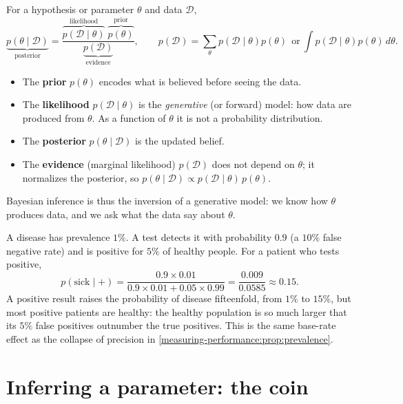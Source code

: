 \begin{notechapter}
For a hypothesis or parameter $\theta$ and data $\mathcal D$,
\[
  \underbrace{p(\theta\mid\mathcal D)}_{\text{posterior}}
  = \frac{\overbrace{p(\mathcal D\mid\theta)}^{\text{likelihood}}\;\overbrace{p(\theta)}^{\text{prior}}}{\underbrace{p(\mathcal D)}_{\text{evidence}}},
  \qquad
  p(\mathcal D) = \sum_\theta p(\mathcal D\mid\theta)p(\theta)\ \ \text{or}\ \int p(\mathcal D\mid\theta)p(\theta)\,d\theta .
\]
\begin{itemize}
  \item The \textbf{prior} $p(\theta)$ encodes what is believed before seeing the
        data.
  \item The \textbf{likelihood} $p(\mathcal D\mid\theta)$ is the \emph{generative}
        (or forward) model: how data are produced from $\theta$. As a function of
        $\theta$ it is not a probability distribution.
  \item The \textbf{posterior} $p(\theta\mid\mathcal D)$ is the updated belief.
  \item The \textbf{evidence} (marginal likelihood) $p(\mathcal D)$ does not depend
        on $\theta$; it normalizes the posterior, so
        $p(\theta\mid\mathcal D)\propto p(\mathcal D\mid\theta)\,p(\theta)$.
\end{itemize}
Bayesian inference is thus the inversion of a generative model: we know how
$\theta$ produces data, and we ask what the data say about $\theta$.

\begin{example}\label{bayesian-reasoning:ex:medical}
A disease has prevalence $1\%$. A test detects it with probability $0.9$ (a
$10\%$ false negative rate) and is positive for $5\%$ of healthy people. For a
patient who tests positive,
\[
  p(\text{sick}\mid+) = \frac{0.9\times0.01}{0.9\times0.01 + 0.05\times0.99}
  = \frac{0.009}{0.0585}\approx0.15 .
\]
A positive result raises the probability of disease fifteenfold, from $1\%$ to
$15\%$, but most positive patients are healthy: the healthy population is so
much larger that its $5\%$ false positives outnumber the true positives. This is
the same base-rate effect as the collapse of precision in
\cref{measuring-performance:prop:prevalence}.
\end{example}

\section{Inferring a parameter: the coin}\label{bayesian-reasoning:sec:coin}


\end{notechapter}
